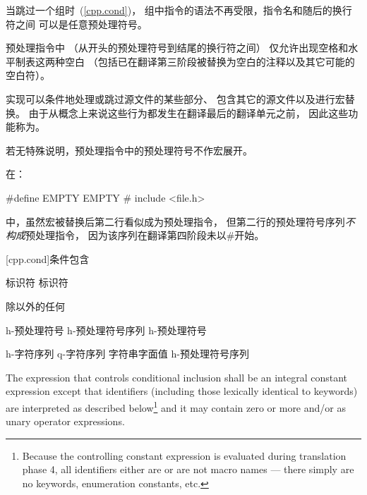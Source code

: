 \pnum
当跳过一个组时~(\ref{cpp.cond})，
组中指令的语法不再受限，指令名和随后的换行符之间
可以是任意预处理符号。

\pnum
预处理指令中
（从开头的预处理符号\tcode{\#}到结尾的换行符之间）
仅允许出现空格和水平制表这两种空白
（包括已在翻译第三阶段被替换为空白的注释以及其它可能的空白符）。

\pnum
实现可以条件地处理或跳过源文件的某些部分、
包含其它的源文件以及进行宏替换。
由于从概念上来说这些行为都发生在翻译最后的翻译单元之前，
因此这些功能称为。

\pnum
若无特殊说明，预处理指令中的预处理符号不作宏展开。

\enterexample 在：

\begin{codeblock}
#define EMPTY
EMPTY   #   include <file.h>
\end{codeblock}

中，虽然宏被替换后第二行看似成为预处理指令，
但第二行的预处理符号序列\textit{不构成}预处理指令，
因为该序列在翻译第四阶段未以\#开始。

[cpp.cond]{条件包含}%
%

%
\begin{ncbnf}
\br
     标识符\br
     标识符 \terminal{)}
\end{ncbnf}

\begin{ncbnf}
\br
    \textnormal{除\terminal{>}以外的任何}
\end{ncbnf}

\begin{ncbnf}
\br
    h-预处理符号\br
    h-预处理符号序列 h-预处理符号
\end{ncbnf}

%
\begin{ncbnf}
\br
     h-字符序列 \terminal{> )}\br
     q-字符序列 \br
       字符串字面值  \terminal{)}\br
     h-预处理符号序列     \terminal{> )}
\end{ncbnf}

\pnum
The expression that controls conditional inclusion
shall be an integral constant expression except that
identifiers
(including those lexically identical to keywords)
are interpreted as described below\footnote{Because the controlling constant expression is evaluated
during translation phase 4,
all identifiers either are or are not macro names ---
there simply are no keywords, enumeration constants, etc.}
and it may contain zero or more  and/or
 as unary operator expressions.

